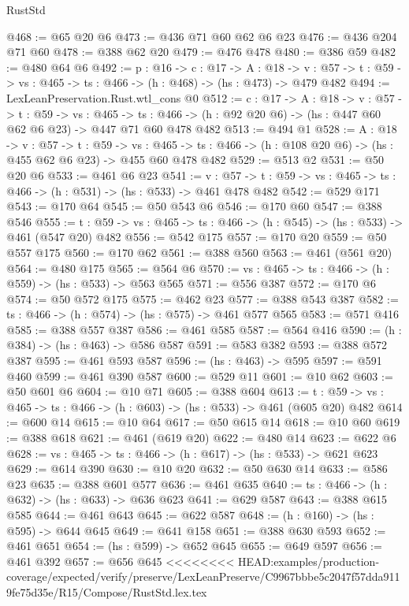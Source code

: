 \begin{lexlean}{RustStd}
\begin{coremodule}
{\begin{coremodule}
@468 := @65 @20 @6
@473 := @436 @71 @60 @62 @6 @23
@476 := @436 @204 @71 @60
@478 := @388 @62 @20
@479 := @476 @478
@480 := @386 @59
@482 := @480 @64 @6
@492 := {p : @16} ->
  {c : @17} ->
  {A : @18} ->
  {v : @57} -> {t : @59} -> {vs : @465} -> {ts : @466} -> (h : @468) -> (hs : @473) -> @479 @482
@494 := LexLeanPreservation.Rust.wtl_cons @0
@512 := {c : @17} ->
  {A : @18} ->
  {v : @57} ->
  {t : @59} ->
  {vs : @465} ->
  {ts : @466} -> (h : @92 @20 @6) -> (hs : @447 @60 @62 @6 @23) -> @447 @71 @60 @478 @482
@513 := @494 @1
@528 := {A : @18} ->
  {v : @57} ->
  {t : @59} ->
  {vs : @465} -> {ts : @466} -> (h : @108 @20 @6) -> (hs : @455 @62 @6 @23) -> @455 @60 @478 @482
@529 := @513 @2
@531 := @50 @20 @6
@533 := @461 @6 @23
@541 := {v : @57} ->
  {t : @59} -> {vs : @465} -> {ts : @466} -> (h : @531) -> (hs : @533) -> @461 @478 @482
@542 := @529 @171
@543 := @170 @64
@545 := @50 @543 @6
@546 := @170 @60
@547 := @388 @546
@555 := {t : @59} -> {vs : @465} -> {ts : @466} -> (h : @545) -> (hs : @533) -> @461 (@547 @20) @482
@556 := @542 @175
@557 := @170 @20
@559 := @50 @557 @175
@560 := @170 @62
@561 := @388 @560
@563 := @461 (@561 @20)
@564 := @480 @175
@565 := @564 @6
@570 := {vs : @465} -> {ts : @466} -> (h : @559) -> (hs : @533) -> @563 @565
@571 := @556 @387
@572 := @170 @6
@574 := @50 @572 @175
@575 := @462 @23
@577 := @388 @543 @387
@582 := {ts : @466} -> (h : @574) -> (hs : @575) -> @461 @577 @565
@583 := @571 @416
@585 := @388 @557 @387
@586 := @461 @585
@587 := @564 @416
@590 := (h : @384) -> (hs : @463) -> @586 @587
@591 := @583 @382
@593 := @388 @572 @387
@595 := @461 @593 @587
@596 := (hs : @463) -> @595
@597 := @591 @460
@599 := @461 @390 @587
@600 := @529 @11
@601 := @10 @62
@603 := @50 @601 @6
@604 := @10 @71
@605 := @388 @604
@613 := {t : @59} -> {vs : @465} -> {ts : @466} -> (h : @603) -> (hs : @533) -> @461 (@605 @20) @482
@614 := @600 @14
@615 := @10 @64
@617 := @50 @615 @14
@618 := @10 @60
@619 := @388 @618
@621 := @461 (@619 @20)
@622 := @480 @14
@623 := @622 @6
@628 := {vs : @465} -> {ts : @466} -> (h : @617) -> (hs : @533) -> @621 @623
@629 := @614 @390
@630 := @10 @20
@632 := @50 @630 @14
@633 := @586 @23
@635 := @388 @601 @577
@636 := @461 @635
@640 := {ts : @466} -> (h : @632) -> (hs : @633) -> @636 @623
@641 := @629 @587
@643 := @388 @615 @585
@644 := @461 @643
@645 := @622 @587
@648 := (h : @160) -> (hs : @595) -> @644 @645
@649 := @641 @158
@651 := @388 @630 @593
@652 := @461 @651
@654 := (hs : @599) -> @652 @645
@655 := @649 @597
@656 := @461 @392
@657 := @656 @645
<<<<<<<< HEAD:examples/production-coverage/expected/verify/preserve/LexLeanPreserve/C9967bbbe5c2047f57dda9119fe75d35e/R15/Compose/RustStd.lex.tex

\end{coremodule}}
\end{coremodule}
\end{lexlean}
